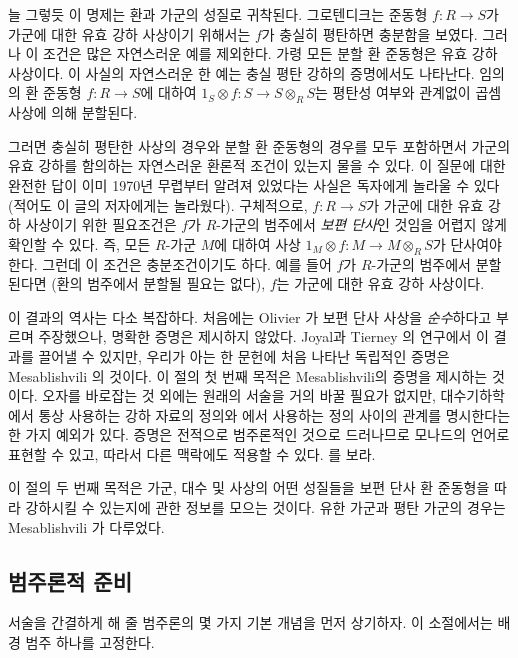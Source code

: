 \medskip\noindent
늘 그렇듯 이 명제는 환과 가군의 성질로 귀착된다. 그로텐디크는 준동형
$f: R \to S$가 가군에 대한 유효 강하 사상이기 위해서는 $f$가 충실히
평탄하면 충분함을 보였다. 그러나 이 조건은 많은 자연스러운 예를 제외한다.
가령 모든 분할 환 준동형은 유효 강하 사상이다. 이 사실의 자연스러운 한
예는 충실 평탄 강하의 증명에서도 나타난다. 임의의 환 준동형
$f: R \to S$에 대하여 $1_S \otimes f: S \to S \otimes_R S$는 평탄성
여부와 관계없이 곱셈 사상에 의해 분할된다.

\medskip\noindent
그러면 충실히 평탄한 사상의 경우와 분할 환 준동형의 경우를 모두 포함하면서
가군의 유효 강하를 함의하는 자연스러운 환론적 조건이 있는지 물을 수 있다.
이 질문에 대한 완전한 답이 이미 1970년 무렵부터 알려져 있었다는 사실은
독자에게 놀라울 수 있다(적어도 이 글의 저자에게는 놀라웠다). 구체적으로,
$f: R \to S$가 가군에 대한 유효 강하 사상이기 위한 필요조건은 $f$가
$R$-가군의 범주에서 {\it 보편 단사}인 것임을 어렵지 않게 확인할 수 있다.
즉, 모든 $R$-가군 $M$에 대하여 사상
$1_M  \otimes f: M \to M \otimes_R S$가 단사여야 한다. 그런데 이 조건은
충분조건이기도 하다. 예를 들어 $f$가 $R$-가군의 범주에서 분할된다면
(환의 범주에서 분할될 필요는 없다), $f$는 가군에 대한 유효 강하 사상이다.
 
\medskip\noindent
이 결과의 역사는 다소 복잡하다. 처음에는 Olivier \cite{olivier}가
보편 단사 사상을 {\it 순수}하다고 부르며 주장했으나, 명확한 증명은
제시하지 않았다. Joyal과 Tierney \cite{joyal-tierney}의 연구에서 이 결과를
끌어낼 수 있지만, 우리가 아는 한 문헌에 처음 나타난 독립적인 증명은
Mesablishvili \cite{mesablishvili1}의 것이다. 이 절의 첫 번째 목적은
Mesablishvili의 증명을 제시하는 것이다. 오자를 바로잡는 것 외에는 원래의
서술을 거의 바꿀 필요가 없지만, 대수기하학에서 통상 사용하는 강하 자료의
정의와 \cite{mesablishvili1}에서 사용하는 정의 사이의 관계를 명시한다는
한 가지 예외가 있다. 증명은 전적으로 범주론적인 것으로 드러나므로 모나드의
언어로 표현할 수 있고, 따라서 다른 맥락에도 적용할 수 있다.
\cite{janelidze-tholen}를 보라.

\medskip\noindent
이 절의 두 번째 목적은 가군, 대수 및 사상의 어떤 성질들을 보편 단사 환
준동형을 따라 강하시킬 수 있는지에 관한 정보를 모으는 것이다. 유한 가군과
평탄 가군의 경우는 Mesablishvili \cite{mesablishvili2}가 다루었다.


\subsection{범주론적 준비}
\label{subsection-category-prelims}

\noindent
서술을 간결하게 해 줄 범주론의 몇 가지 기본 개념을 먼저 상기하자. 이
소절에서는 배경 범주 하나를 고정한다.

